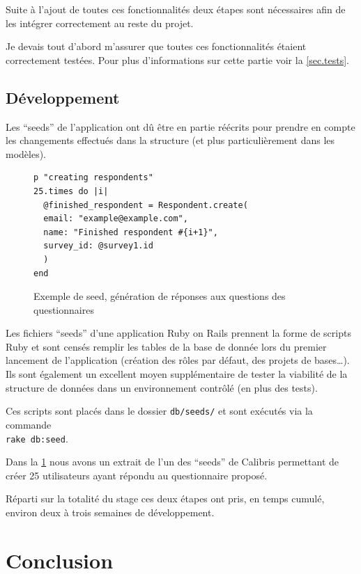 \documentclass[12pt,a4paper]{book}
\begin{document}
Suite à l'ajout de toutes ces fonctionnalités deux étapes sont nécessaires afin de les intégrer correctement au reste du projet.

Je devais tout d'abord m'assurer que toutes ces fonctionnalités étaient correctement testées. Pour plus d'informations sur cette partie voir la \cref{sec.tests}.

\subsection{Développement}

Les ``seeds'' de l'application ont dû être en partie réécrits pour prendre en compte les changements effectués dans la structure (et plus particulièrement dans les modèles).

  \begin{figure}[h]
  \lstset{language=ruby}
  \begin{lstlisting}
p "creating respondents"
25.times do |i|
  @finished_respondent = Respondent.create(
  email: "example@example.com",
  name: "Finished respondent #{i+1}",
  survey_id: @survey1.id
  )
end
  \end{lstlisting}
   \caption{Exemple de seed, génération de réponses aux questions des questionnaires}
  \label{fig.seeds}
  \end{figure}

Les fichiers ``seeds'' d'une application Ruby on Rails prennent la forme de scripts Ruby et sont censés remplir les tables de la base de donnée lors du premier lancement de l'application (création des rôles par défaut, des projets de bases…). Ils sont également un excellent moyen supplémentaire de tester la viabilité de la structure de données dans un environnement contrôlé (en plus des tests).

Ces scripts sont placés dans le dossier \texttt{db/seeds/} et sont exécutés via la commande \\
\texttt{rake db:seed}.

Dans la \cref{fig.seeds} nous avons un extrait de l'un des ``seeds'' de Calibris permettant de créer 25 utilisateurs ayant répondu au questionnaire proposé. 

Réparti sur la totalité du stage ces deux étapes ont pris, en temps cumulé, environ deux à trois semaines de développement.

\section*{Conclusion}
\end{document}
